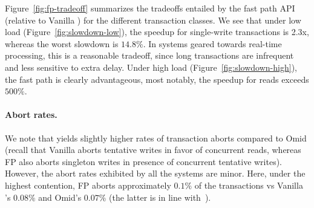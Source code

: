 Figure~\ref{fig:fp-tradeoff} summarizes the tradeoffs entailed by the fast path API
(relative to Vanilla \sys) for the different transaction classes. 
We see that under low load (Figure~\ref{fig:slowdown-low}),
the speedup for single-write transactions is 2.3x, whereas the worst slowdown is $14.8\%$. 
In systems geared towards real-time processing, this is a reasonable tradeoff, since long transactions 
are infrequent and less sensitive to extra delay.
Under high load (Figure~\ref{fig:slowdown-high}), the fast path is clearly advantageous, most notably, the speedup for reads exceeds $500\%$.



\paragraph{Abort rates.}

We note that \sys\/ yields slightly higher rates of transaction aborts compared to Omid 
(recall that Vanilla \sys\/ aborts tentative writes in favor of concurrent reads, whereas FP \sys\/ also aborts
singleton writes in presence of concurrent tentative writes). However, the abort rates exhibited by all  
the systems are minor. Here, under the highest contention, FP \sys\/ aborts approximately $0.1\%$ 
of the transactions vs Vanilla \sys's $0.08\%$ and Omid's $0.07\%$ 
(the latter  is in line with~\cite{Omid2017}).  
\remove{
}
